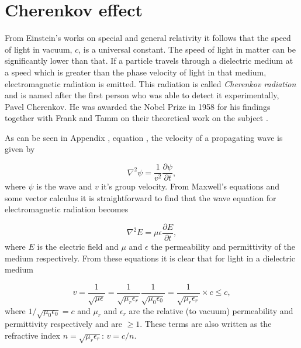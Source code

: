 \section{Cherenkov effect}
From Einstein's works on special and general relativity it follows that the speed of light in vacuum, $c$, is a universal constant. The speed of light in matter can be significantly lower than that. If a particle travels through a dielectric medium at a speed which is greater than the phase velocity of light in that medium, electromagnetic radiation is emitted. This radiation is called \textit{Cherenkov radiation} and is named after the first person who was able to detect it experimentally, Pavel Cherenkov. He was awarded the Nobel Prize in 1958 for his findings together with Frank and Tamm on their theoretical work on the subject \cite{nobel1958url}.

As can be seen in Appendix \cite{ch:planck}, equation \cite{eq:wave}, the velocity of a propagating wave is given by

\begin{equation}
\nabla^2\psi = \frac{1}{v^2} \frac{\partial \psi}{\partial t},
\end{equation}
where $\psi$ is the wave and $v$ it's group velocity. From Maxwell's equations and some vector calculus it is straightforward to find that the wave equation for electromagnetic radiation becomes

\begin{equation}
\nabla^2E = \mu \epsilon \frac{\partial E}{\partial t},
\end{equation}
where $E$ is the electric field and $\mu$ and $\epsilon$ the permeability and permittivity of the medium respectively. From these equations it is clear that for light in a dielectric medium

\begin{equation}
v = \frac{1}{\sqrt{\mu \epsilon}} = \frac{1}{\sqrt{\mu_r \epsilon_r}}\frac{1}{\sqrt{\mu_0 \epsilon_0}} = \frac{1}{\sqrt{\mu_r \epsilon_r}} \times c \leq c,
\end{equation}
where $1/\sqrt{\mu_0 \epsilon_0} = c$ and $\mu_r$ and $\epsilon_r$ are the relative (to vacuum) permeability and permittivity respectively and are $\geq 1$. These terms are also written as the refractive index $n = \sqrt{\mu_r \epsilon_r}$: $v = c/n$.


